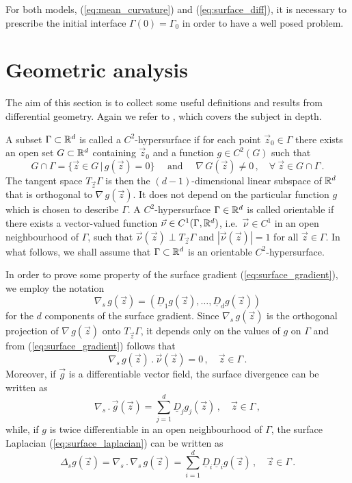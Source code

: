 For both models, (\ref{eq:mean_curvature}) and (\ref{eq:surface_diff}), it is
necessary to prescribe the initial interface $\Gamma(0)=\Gamma_0$ in order to
have a well posed problem.

\section{Geometric analysis}\label{sec:geometric_analysis}
The aim of this section is to collect some useful definitions and results from
differential geometry. Again we refer to \cite{DeckelnickDE05}, which covers the
subject in depth.

A subset $\Gamma \subset \mathbb R^d$ is called a $C^2$-hypersurface if for each point
$\vec z_0 \in \Gamma$ there exists an open set $G \subset \mathbb R^d$ containing
$\vec z_0$ and a function $g \in C^2(G)$ such that
\begin{equation}
G \cap \Gamma = \{ \vec z \in G \, | \, g(\vec z) = 0 \}
\quad \mbox{ and } \quad \nabla \, G(\vec z) \neq 0\,,
\quad \forall\ \vec z \in G \cap \Gamma \, .
\end{equation}
The tangent space $T_{\vec z} \Gamma$ is then the $(d-1)$-dimensional linear
subspace of $\mathbb R^d$ that is orthogonal to $\nabla \, g(\vec z)$. It does not
depend on the particular function $g$ which is chosen to describe $\Gamma$. A
$C^2$-hypersurface $\Gamma \in \mathbb R^d$ is called orientable if there exists a
vector-valued function $\vec\nu \in C^1(\Gamma, \mathbb R^d)$, i.e.~$\vec\nu \in C^1$
in an open neighbourhood of $\Gamma$, such that $\vec\nu(\vec z) \perp T_{\vec
z} \Gamma$ and $|\vec \nu(\vec z)| = 1$ for all $\vec z \in \Gamma$. In what
follows, we shall assume that $\Gamma \subset \mathbb R^d$ is an orientable
$C^2$-hypersurface.

In order to prove some property of the surface gradient
(\ref{eq:surface_gradient}), we employ the notation
\begin{equation}
\nabla_s \, g(\vec z) = (\underline{D}_1 g(\vec z), \hdots, \underline{D}_{d}
g(\vec z))
\end{equation}
for the $d$ components of the surface gradient. Since $\nabla_s \, g(\vec z)$
is the orthogonal projection of $\nabla \, g(\vec z)$ onto $T_{\vec z} \Gamma$,
it depends only on the values of $g$ on $\Gamma$ and from
(\ref{eq:surface_gradient}) follows that
\begin{equation}\label{eq:surface_gradient_comp}
\nabla_s \, g(\vec z) \,.\, \vec \nu(\vec z)=0\,, \quad \vec z \in \Gamma\,.
\end{equation}
Moreover, if $\vec g$ is a differentiable vector field, the surface divergence
can be written as
\begin{equation}
\nabla_s \,.\, \vec g(\vec z) = \sum_{j = 1}^d \underline{D}_j g_j (\vec z)\,,
\quad \vec z \in \Gamma\,,
\end{equation}
while, if $g$ is twice differentiable in an open neighbourhood of
$\Gamma$, the surface Laplacian (\ref{eq:surface_laplacian}) can be written as
\begin{equation}\label{eq:surface_laplacian_comp}
\Delta_s g(\vec z) = \nabla_s\, . \,\nabla_s \, g(\vec z) =
\sum_{i = 1}^d \underline{D}_i \underline{D}_i g(\vec z) \, ,
\quad \vec z \in \Gamma \,.
\end{equation}

